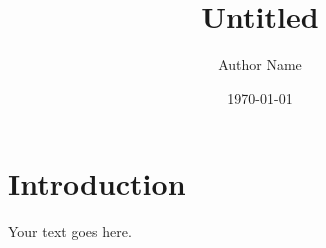 \documentclass[11pt]{article}
\title{Untitled}
\author{Author Name}
\date{\today}
\begin{document}
\maketitle

\section{Introduction}

Your text goes here.
\end{document}
